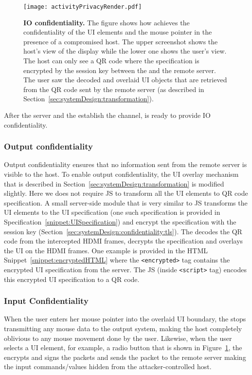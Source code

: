 \begin{figure}[t]
\centering
\texttt{[image: activityPrivacyRender.pdf]}
\caption{\textbf{IO confidentiality.} The figure shows how \name achieves the confidentiality of the UI elements and the mouse pointer in the presence of a compromised host. The upper screenshot shows the host's view of the display while the lower one shows the user's view. The host can only see a QR code where the specification is encrypted by the \tls session key between the \device and the remote server. The user saw the decoded and overlaid UI objects that are retrieved from the QR code sent by the remote server (as described in Section~\ref{sec:systemDesign:transformation}).}
\label{fig:activityPrivacy}
\centering
\end{figure}

After the server and the \device establish the \tls channel, \name is ready to provide IO confidentiality.

\subsubsection{\bfseries Output confidentiality} Output confidentiality ensures that no information sent from the remote server is visible to the host. To enable output confidentiality, the UI overlay mechanism that is described in Section~\ref{sec:systemDesign:transformation} is modified slightly. Here we \name does not require \name JS to transform all the UI elements to QR code specification. A small server-side module that is very similar to \name JS transforms the UI elements to the UI specification (one such specification is provided in Specification~\ref{snippet:UISpecification}) and encrypt the specification with the \tls session key (Section~\ref{sec:systemDesign:confidentiality:tls}). The \device decodes the QR code from the intercepted HDMI frames, decrypts the specification and overlays the UI on the HDMI frames. One example is provided in the HTML Snippet~\ref{snippet:encryptedHTML} where the \texttt{<encrypted>} tag contains the encrypted UI specification from the server. The \name JS (inside \texttt{<script>} tag) encodes this encrypted UI specification to a QR code.

\subsubsection{\bfseries Input Confidentiality} When the user enters her mouse pointer into the overlaid UI boundary, the \device stops transmitting any mouse data to the output system, making the host completely oblivious to any mouse movement done by the user. Likewise, when the user selects a UI element, for example, a radio button that is shown in Figure~\ref{fig:activityPrivacy}, the \device encrypts and signs the packets and sends the packet to the remote server making the input commands/values hidden from the attacker-controlled host.  

